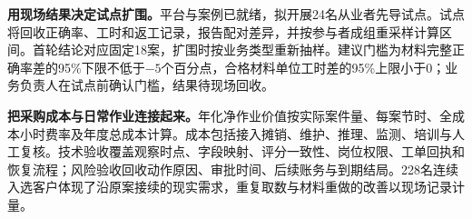 \textbf{用现场结果决定试点扩围。}平台与案例已就绪，拟开展24名从业者先导试点。试点将回收正确率、工时和返工记录，报告配对差异，并按参与者成组重采样计算区间。首轮结论对应固定18案，扩围时按业务类型重新抽样。建议门槛为材料完整正确率差的95\%下限不低于$-5$个百分点，合格材料单位工时差的95\%上限小于0；业务负责人在试点前确认门槛，结果待现场回收。

\textbf{把采购成本与日常作业连接起来。}年化净作业价值按实际案件量、每案节时、全成本小时费率及年度总成本计算。成本包括接入摊销、维护、推理、监测、培训与人工复核。技术验收覆盖观察时点、字段映射、评分一致性、岗位权限、工单回执和恢复流程；风险验收回收动作原因、审批时间、后续账务与到期结局。228名连续入选客户体现了沿原案接续的现实需求，重复取数与材料重做的改善以现场记录计量。
